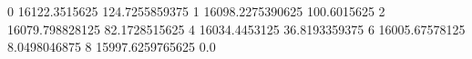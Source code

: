 0 16122.3515625 124.7255859375
1 16098.2275390625 100.6015625
2 16079.798828125 82.1728515625
4 16034.4453125 36.8193359375
6 16005.67578125 8.0498046875
8 15997.6259765625 0.0

